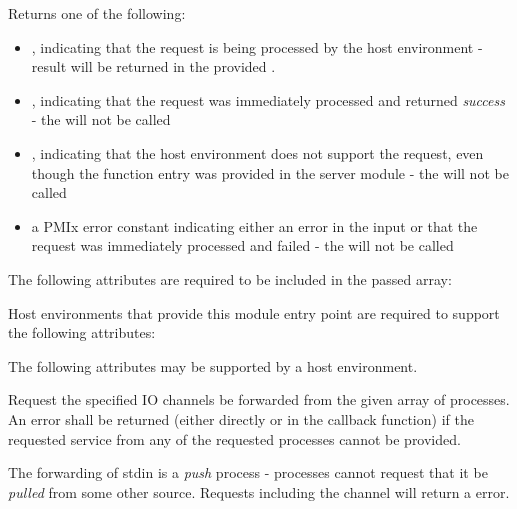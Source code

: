 Returns one of the following:

\begin{itemize}
    \item {}, indicating that the request is being processed by the host environment - result will be returned in the provided .
    \item {}, indicating that the request was immediately processed and returned \textit{success} - the  will not be called
    \item {}, indicating that the host environment does not support the request, even though the function entry was provided in the server module - the  will not be called
    \item a PMIx error constant indicating either an error in the input or that the request was immediately processed and failed - the  will not be called
\end{itemize}


\reqattrstart
The following attributes are required to be included in the passed  array:


\divider

Host environments that provide this module entry point are required to support the following attributes:


\reqattrend

\optattrstart
The following attributes may be supported by a host environment.


\optattrend

\descr

Request the specified IO channels be forwarded from the given array of processes. An error shall be returned (either directly or in the callback function) if the requested service from any of the requested processes cannot be provided.

\adviceimplstart
The forwarding of stdin is a \textit{push} process - processes cannot request that it be \textit{pulled} from some other source. Requests including the  channel will return a  error.
\adviceimplend

